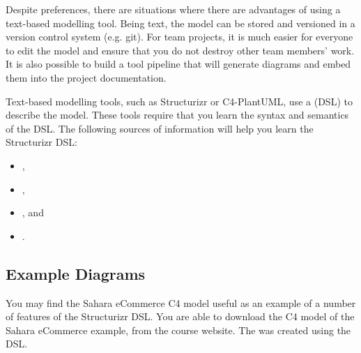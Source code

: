 Despite preferences, there are situations where there are advantages of using a text-based modelling tool.
Being text, the model can be stored and versioned in a version control system (e.g. git).
For team projects, it is much easier for everyone to edit the model and ensure that you do not destroy other team members' work.
It is also possible to build a tool pipeline that will generate diagrams and embed them into the project documentation.

Text-based modelling tools, such as Structurizr or C4-PlantUML, use a
 (DSL) to describe the model.
These tools require that you learn the syntax and semantics of the DSL.
The following sources of information will help you learn the Structurizr DSL:
\begin{itemize}[nosep]
    \item {},
    \item {}, 
    \item {}, and
    \item {}.
\end{itemize}

\subsection{Example Diagrams}
You may find the Sahara eCommerce C4 model useful as an example of a number of features of the Structurizr DSL.
You are able to download the C4 model of the Sahara eCommerce example, from the course website.
The 
was created using the  DSL.
